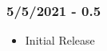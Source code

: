 \documentclass[12pt]{article}
\begin{document}
\subsubsection*{5/5/2021 - 0.5}
\begin{itemize}
\item Initial Release
\end{itemize}

\pagebreak

\begin{center}
\vspace*{-2.5cm}
\end{center}
\end{document}
